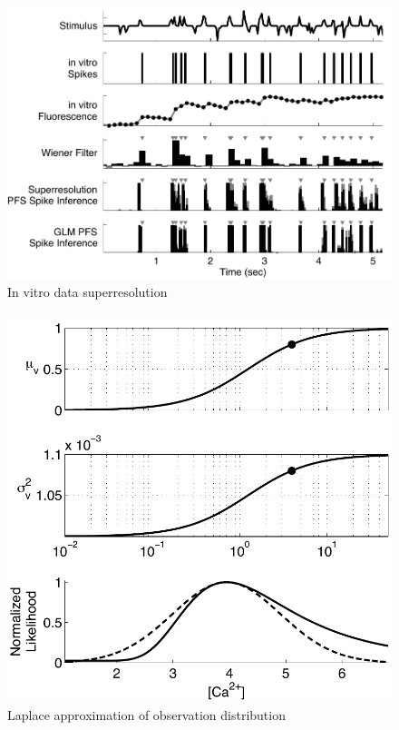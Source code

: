\documentclass[10pt]{article}
\begin{document}
\clearpage \newpage
\begin{figure}
\includegraphics[width=1.0\linewidth]{StimData_bw}
\caption{In vitro data superresolution} \label{fig:real}
\end{figure}

\clearpage \newpage
\begin{figure}
\includegraphics[width=\linewidth]{ca_nonlin}
\caption{Laplace approximation of observation distribution} \label{fig:ca_nonlin}
\end{figure}
\end{document}
